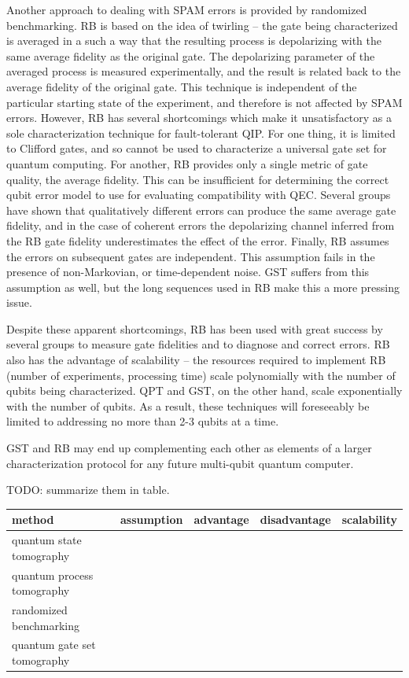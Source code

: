 \documentclass[11pt, oneside]{article}   	%
\begin{document}
Another approach to dealing with SPAM errors is provided by randomized benchmarking. 
RB is based on the idea of twirling -- the gate being characterized is averaged in a such a way that the resulting process is depolarizing with the same average fidelity as the original gate. 
The depolarizing parameter of the averaged process is measured experimentally, and the result is related back to the average fidelity of the original gate. 
This technique is independent of the particular starting state of the experiment, and therefore is not affected by SPAM errors. 
However, RB has several shortcomings which make it unsatisfactory as a sole characterization technique for fault-tolerant QIP. 
For one thing, it is limited to Clifford gates, and so cannot be used to characterize a universal gate set for quantum computing. 
For another, RB provides only a single metric of gate quality, the average fidelity. 
This can be insufficient for determining the correct qubit error model to use for evaluating compatibility with QEC. 
Several groups have shown that qualitatively different errors can produce the same average gate fidelity, and in the case of coherent errors the depolarizing channel inferred from the RB gate fidelity underestimates the effect of the error. 
Finally, RB assumes the errors on subsequent gates are independent. 
This assumption fails in the presence of non-Markovian, or time-dependent noise. 
GST suffers from this assumption as well, but the long sequences used in RB make this a more pressing issue.

Despite these apparent shortcomings, RB has been used with great success by several groups to measure gate fidelities and to diagnose and correct errors. 
RB also has the advantage of scalability -- the resources required to implement RB (number of experiments, processing time) scale polynomially with the number of qubits being characterized. 
QPT and GST, on the other hand, scale exponentially with the number of qubits. 
As a result, these techniques will foreseeably be limited to addressing no more than 2-3 qubits at a time. 

GST and RB may end up complementing each other as elements of a larger characterization protocol for any future multi-qubit quantum computer.

TODO: summarize them in table.
\begin{table}[h]
\begin{tabular}{l | l | l | l | l}
method & assumption & advantage & disadvantage & scalability \\
\hline
quantum state tomography &  &  &  &  \\
quantum process tomography &  &  &  &  \\
randomized benchmarking &  &  &  & \\
quantum gate set tomography &  &  &  & 
\end{tabular}
\end{table}
\end{document}

